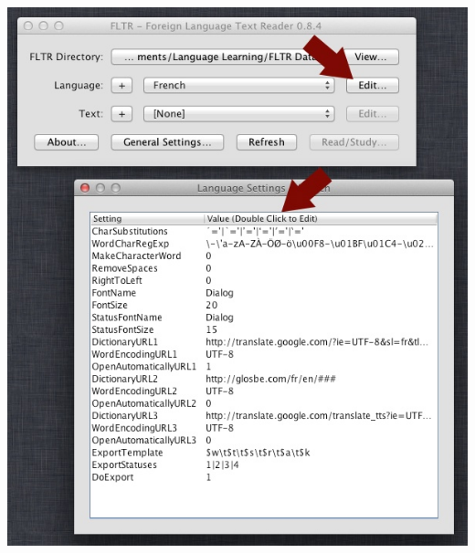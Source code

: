 \documentclass[cn,10pt,math=newtx,citestyle=gb7714-2015,bibstyle=gb7714-2015]{elegantbook}
\begin{document}
\includegraphics[scale=0.6]{image/images-028.png}
\end{document}
